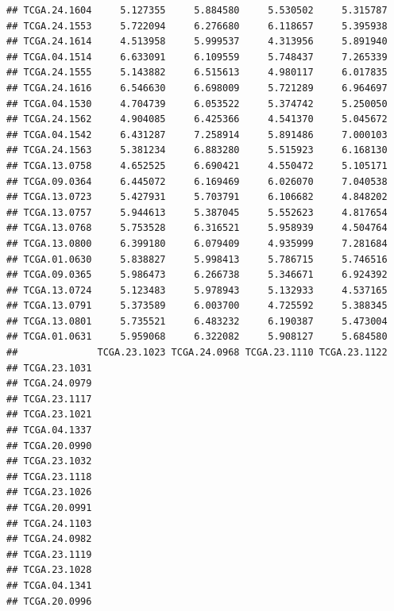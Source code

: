 \documentclass[UTF8]{beamer}\usepackage[]{graphicx}\usepackage[]{color}
\makeatletter
\newenvironment{kframe}{%
 \def\at@end@of@kframe{}%
 \ifinner\ifhmode%
  \def\at@end@of@kframe{\end{minipage}}%
  \begin{minipage}{\columnwidth}%
 \fi\fi%
 \def\FrameCommand##1{\hskip\@totalleftmargin \hskip-\fboxsep
 \colorbox{shadecolor}{##1}\hskip-\fboxsep
     \hskip-\linewidth \hskip-\@totalleftmargin \hskip\columnwidth}%
 \MakeFramed {\advance\hsize-\width
   \@totalleftmargin\z@ \linewidth\hsize
   \@setminipage}}%
 {\par\unskip\endMakeFramed%
 \at@end@of@kframe}
\newenvironment{knitrout}{}{} %
\makeatother
\begin{document}
\begin{frame}[fragile]
\begin{knitrout}
\begin{kframe}
\begin{verbatim}
## TCGA.24.1604     5.127355     5.884580     5.530502     5.315787
## TCGA.24.1553     5.722094     6.276680     6.118657     5.395938
## TCGA.24.1614     4.513958     5.999537     4.313956     5.891940
## TCGA.04.1514     6.633091     6.109559     5.748437     7.265339
## TCGA.24.1555     5.143882     6.515613     4.980117     6.017835
## TCGA.24.1616     6.546630     6.698009     5.721289     6.964697
## TCGA.04.1530     4.704739     6.053522     5.374742     5.250050
## TCGA.24.1562     4.904085     6.425366     4.541370     5.045672
## TCGA.04.1542     6.431287     7.258914     5.891486     7.000103
## TCGA.24.1563     5.381234     6.883280     5.515923     6.168130
## TCGA.13.0758     4.652525     6.690421     4.550472     5.105171
## TCGA.09.0364     6.445072     6.169469     6.026070     7.040538
## TCGA.13.0723     5.427931     5.703791     6.106682     4.848202
## TCGA.13.0757     5.944613     5.387045     5.552623     4.817654
## TCGA.13.0768     5.753528     6.316521     5.958939     4.504764
## TCGA.13.0800     6.399180     6.079409     4.935999     7.281684
## TCGA.01.0630     5.838827     5.998413     5.786715     5.746516
## TCGA.09.0365     5.986473     6.266738     5.346671     6.924392
## TCGA.13.0724     5.123483     5.978943     5.132933     4.537165
## TCGA.13.0791     5.373589     6.003700     4.725592     5.388345
## TCGA.13.0801     5.735521     6.483232     6.190387     5.473004
## TCGA.01.0631     5.959068     6.322082     5.908127     5.684580
##              TCGA.23.1023 TCGA.24.0968 TCGA.23.1110 TCGA.23.1122
## TCGA.23.1031                                                    
## TCGA.24.0979                                                    
## TCGA.23.1117                                                    
## TCGA.23.1021                                                    
## TCGA.04.1337                                                    
## TCGA.20.0990                                                    
## TCGA.23.1032                                                    
## TCGA.23.1118                                                    
## TCGA.23.1026                                                    
## TCGA.20.0991                                                    
## TCGA.24.1103                                                    
## TCGA.24.0982                                                    
## TCGA.23.1119                                                    
## TCGA.23.1028                                                    
## TCGA.04.1341                                                    
## TCGA.20.0996                                                    

\end{verbatim}
\end{kframe}
\end{knitrout}
\end{frame}
\end{document}
